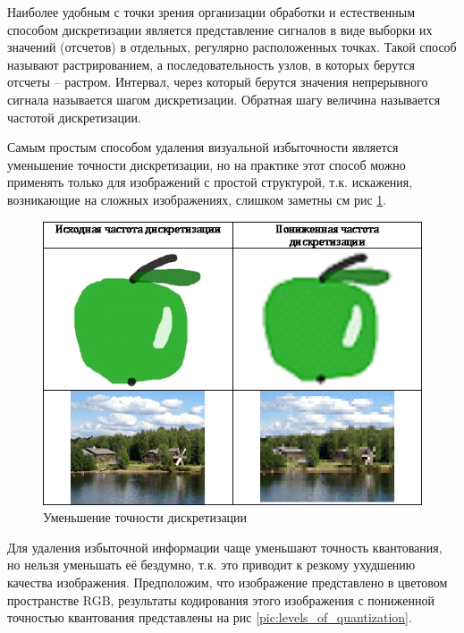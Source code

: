 Наиболее удобным с точки зрения организации обработки и естественным способом дискретизации является представление сигналов в виде выборки их значений (отсчетов) в отдельных, регулярно расположенных точках. Такой способ называют растрированием, а последовательность узлов, в которых берутся отсчеты – растром. Интервал, через который берутся значения непрерывного сигнала называется шагом дискретизации. Обратная шагу величина называется частотой дискретизации.

Самым простым способом удаления визуальной избыточности является уменьшение точности дискретизации, но на практике этот способ можно применять только для изображений с простой структурой, т.к. искажения, возникающие на сложных изображениях, слишком заметны см рис \ref{pic:discretization}.

\begin{figure}[H]
	\begin{center}
		\includegraphics[scale=0.9]{pics/quantization/discretization.png}
		\caption{Уменьшение точности дискретизации} 
		\label{pic:discretization}
	\end{center}
\end{figure}
Для удаления избыточной информации чаще уменьшают точность квантования, но нельзя уменьшать её бездумно, т.к. это приводит к резкому ухудшению качества изображения. Предположим, что изображение представлено в цветовом пространстве RGB, результаты кодирования этого изображения с пониженной точностью квантования представлены на рис \ref{pic:levels_of_quantization}.

